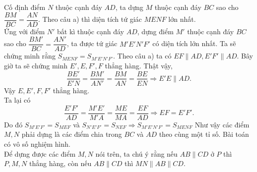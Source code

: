 \begin{bt}
{\begin{enumerate}
\begin{center}
			\end{center}
			Cố định điểm $N$ thuộc cạnh đáy $AD$, ta dựng $M$ thuộc cạnh đáy $BC$ sao cho $\dfrac{BM}{BC}=\dfrac{AN}{AD}$. Theo câu a) thì diện tích tứ giác $MENF$ lớn nhất.\\
			Ứng với điểm $N'$ bất kì thuộc cạnh đáy $AD$, dựng điểm $M'$ thuộc cạnh đáy $BC$ sao cho $\dfrac{BM'}{BC}=\dfrac{AN'}{AD}$, ta được tứ giác $M'E'N'F'$ có diện tích lớn nhất. Ta sẽ chứng minh rằng $S_{MENF}=S_{M'E'N'F'}$. Theo câu a) ta có $EF \parallel AD, E'F' \parallel AD$. Bây giờ ta sẽ chứng minh $E', E, F', F$ thẳng hàng. Thật vậy, $$\dfrac{BE'}{E'N}=\dfrac{BM'}{AN'}=\dfrac{BM}{AN}=\dfrac{BE}{EN}\Rightarrow E'E \parallel AD.$$
			Vậy $E, E', F, F'$ thẳng hàng. \\
			Ta lại có $$\dfrac{E'F'}{AD}=\dfrac{M'E'}{M'A}=\dfrac{ME}{MA}=\dfrac{EF}{AD}\Rightarrow EF = E'F'.$$
			Do đó $S_{M'E'F'} = S_{MEF}$ và $S_{N'E'F'}=S_{NEF}\Rightarrow S_{M'E'N'F'}=S_{MENF}$
			Như vậy các điểm $M, N$ phải dựng là các điểm chia trong $BC$ và $AD$ theo cùng một tỉ số. Bài toán có vô số nghiệm hình.\\
			Để dựng được các điểm $M, N$ nói trên, ta chú ý rằng nếu $AB\parallel CD$ ở $P$ thì $P, M, N$ thẳng hàng, còn nếu $AB\parallel CD$ thì $MN\parallel AB\parallel CD$.
		\end{enumerate}
	}
\end{bt}